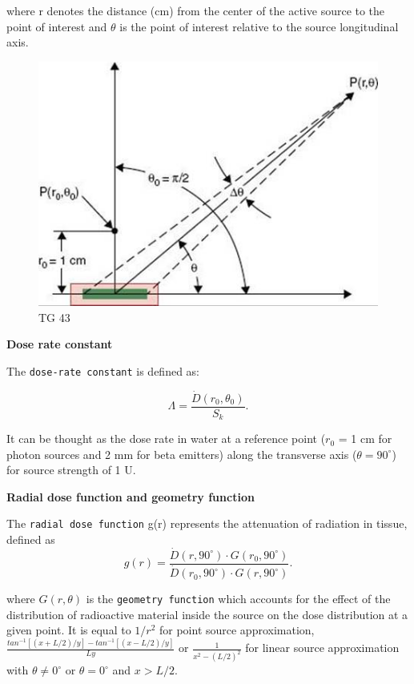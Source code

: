 \documentclass[]{book}
\theoremstyle{definition}
\theoremstyle{definition}
\theoremstyle{definition}
\theoremstyle{remark}
\begin{document}
where r denotes the distance (cm) from the center of the active source
to the point of interest and \(\theta\) is the point of interest
relative to the source longitudinal axis.

\begin{figure}
\centering
\includegraphics{figures/tg43.jpg}
\caption{TG 43}
\end{figure}

\textbf{Dose rate constant}

The \texttt{dose-rate\ constant} is defined as:

\begin{equation}
   \Lambda = \frac{\dot D(r_0, \theta_0)}{S_k}.
   \label{eq:dose-rate-constant}
\end{equation}

It can be thought as the dose rate in water at a reference point
(\(r_0\) = 1 cm for photon sources and 2 mm for beta emitters) along the
transverse axis (\(\theta = 90^{\circ }\)) for source strength of 1 U.

\textbf{Radial dose function and geometry function}

The \texttt{radial\ dose\ function} g(r) represents the attenuation of
radiation in tissue, defined as\\

\begin{equation}
g(r) = \frac{\dot D(r,90^{\circ})\cdot G(r_0,90^{\circ})}{\dot D(r_0,90^{\circ})\cdot G(r, 90^{\circ})}.
\end{equation}

where \(G(r,\theta)\) is the \texttt{geometry\ function} which accounts
for the effect of the distribution of radioactive material inside the
source on the dose distribution at a given point. It is equal to
\(1/r^2\) for point source approximation,
\(\frac{tan^{-1}[(x+L/2)/y]-tan^{-1}[(x-L/2)/y]}{Ly}\) or
\(\frac{1}{x^2-(L/2)^2}\) for linear source approximation with
\(\theta \neq 0^{\circ}\) or \(\theta = 0^{\circ}\) and \(x>L/2\).
\end{document}
